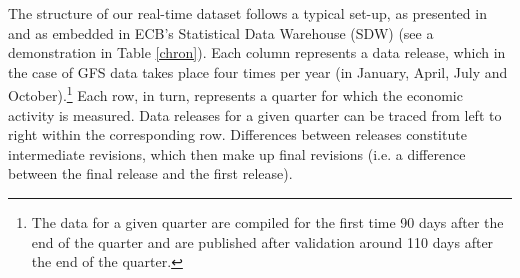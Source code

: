 The structure of our real-time dataset follows a typical set-up, as presented in \citet{diebold_rudebusch} and as embedded in ECB's Statistical Data Warehouse (SDW) (see a demonstration in Table \ref{chron}). Each column represents a data release, which in the case of GFS data takes place four times per year (in January, April, July and October).\footnote{The data for a given quarter are compiled for the first time 90 days after the end of the quarter and are published after validation around 110 days after the end of the quarter. } Each row, in turn, represents a quarter for which the economic activity is measured. Data releases for a given quarter can be traced from left to right within the corresponding row. Differences between releases constitute intermediate revisions, which then make up final revisions (i.e. a difference between the final release and the first release).

